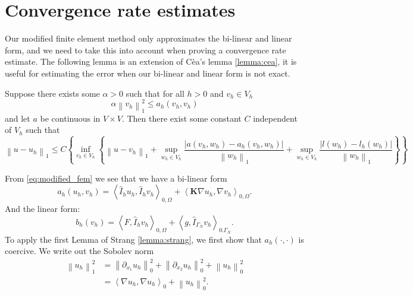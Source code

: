 \documentclass[../Main/main.tex]{subfiles}
\begin{document}
	\section*{Convergence rate estimates}
	Our modified finite element method only approximates the bi-linear and linear form, and we need to take this into account when proving a convergence rate estimate. The following lemma is an extension of Cèa's lemma \ref{lemma:cea}, it is useful for estimating the error when our bi-linear and linear form is not exact.
	\begin{lemma}\label{lemma:strang}
		Suppose there exists some $\alpha>0$ such that for all $h>0$ and $v_h\in V_h$
		\begin{equation*}
			\alpha \left \| v_h \right \|^2_1 \leq a_h(v_h,v_h) 
		\end{equation*}
		and let $a$ be continuous in $V\times V$. Then there exist some constant $C$ independent of $V_h$ such that
		\begin{equation}\label{eq:strang_ineq}
			\left \| u-u_h \right \|_1 \leq C\left \{ \inf_{v_h \in V_h}\left \{ \left \| u-v_h \right \|_1 + \sup_{w_h\in V_h}\frac{|a(v_h,w_h)-a_h(v_h,w_h)|}{\left \| w_h \right \|_1}+\sup_{w_h\in V_h}\frac{|l(w_h)-l_h(w_h)|}{\left \| w_h \right \|_1} \right \} \right \}
		\end{equation}
	\end{lemma}
	From \eqref{eq:modified_fem} we see that we have a bi-linear form 
	\begin{equation}
		a_h(u_h,v_h) = \left \langle \hat{I}_h u_h, \hat{I}_h v_h \right \rangle_{0,\Omega} +  \left \langle\bm{K} \nabla u_h, \nabla v_h \right \rangle_{0,\Omega}.
	\end{equation}
	And the linear form:
	\begin{equation}
		b_h(v_h)= \left \langle F,\hat{I}_h v_h \right \rangle_{0,\Omega} + \left \langle g,\hat{I}_{\Gamma_N} v_h \right \rangle_{0.\Gamma_N}.
	\end{equation}
	To apply the first Lemma of Strang \ref{lemma:strang}, we first show that $a_h(\cdot,\cdot)$ is coercive. We write out the Sobolev norm
	\begin{equation}
		\begin{aligned}
			\left \| u_h \right \|_1^2 &= \left \| \partial_{x_1} u_h \right \|_0^2 + \left \| \partial_{x_2} u_h \right \|_0^2 + \left \| u_h \right \|_0^2 \\
			&= \left \langle \nabla u_h,\nabla u_h \right \rangle_0 + \left \| u_h \right \|_0^2. \\
		\end{aligned}
		\end{equation}
\end{document}
